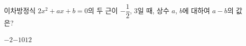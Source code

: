 이차방정식 $2x^2+ax+b=0$의 두 근이 $-\dfrac{1}{2}$, $3$일 때, 상수 $a$, $b$에 대하여 $a-b$의 값은?
\begin{choices32}{$-2$}{$-1$}{$0$}{$1$}{$2$}\end{choices32}
